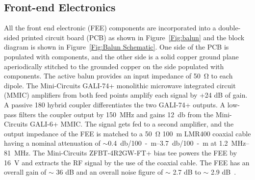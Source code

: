 \subsection{Front-end Electronics}\label{s:fee}

All the front end electronic (FEE) components are incorporated into a double-sided printed circuit board (PCB) as shown in Figure~\ref{Fig:balun} and the block diagram is shown in Figure~\ref{Fig:Balun Schematic}. One side of the PCB is populated with components, and the other side is a solid copper ground plane aperiodically stitched to the grounded copper on the side populated with components. The active balun provides an input impedance of \SI{50}{\ohm} to each dipole. The Mini-Circuits GALI-74+ monolithic microwave integrated circuit (MMIC) amplifiers from both feed points amplify each signal by +24 dB of gain. A passive {180\degree} hybrid coupler differentiates the two GALI-74+ outputs. A low-pass filters the coupler output by \SI{150}{\mega\hertz} and gains \SI{12}{\decibel} from the Mini-Circuits GALI-6+ MMIC. The signal gets fed to a second amplifier, and the output impedance of the FEE is matched to a \SI{50}{\ohm} \SI{100}{\meter} LMR400 coaxial cable having a nominal attenuation of $\sim$\SIrange{0.4}{3.7}{\decibel/100-m} at \SIrange{1.2}{81}{\mega\hertz}. The Mini-Circuits ZFBT-4R2GW-FT+ bias tee powers the FEE by \SI{16}{\volt} and extracts the RF signal by the use of the coaxial cable. The FEE has an overall gain of $\sim$ 36 dB and an overall noise figure of $\sim$ 2.7 dB to $\sim$ 2.9 dB~\citep{Memo35, 2012PASP..124.1090H}.

